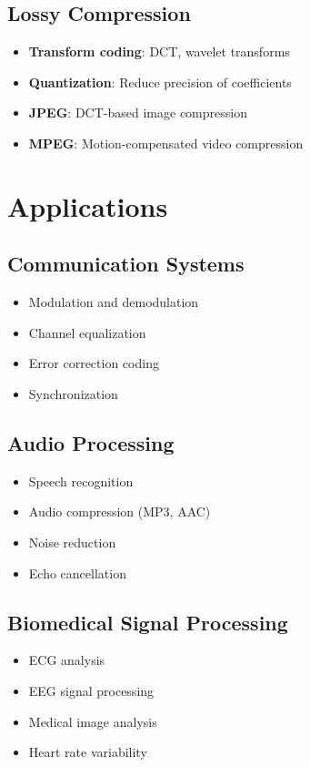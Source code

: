 \documentclass[11pt]{article}
\theoremstyle{definition}
\begin{document}
\subsection{Lossy Compression}
\begin{itemize}
    \item \textbf{Transform coding}: DCT, wavelet transforms
    \item \textbf{Quantization}: Reduce precision of coefficients
    \item \textbf{JPEG}: DCT-based image compression
    \item \textbf{MPEG}: Motion-compensated video compression
\end{itemize}

\section{Applications}

\subsection{Communication Systems}
\begin{itemize}
    \item Modulation and demodulation
    \item Channel equalization
    \item Error correction coding
    \item Synchronization
\end{itemize}

\subsection{Audio Processing}
\begin{itemize}
    \item Speech recognition
    \item Audio compression (MP3, AAC)
    \item Noise reduction
    \item Echo cancellation
\end{itemize}

\subsection{Biomedical Signal Processing}
\begin{itemize}
    \item ECG analysis
    \item EEG signal processing
    \item Medical image analysis
    \item Heart rate variability
\end{itemize}
\end{document}
